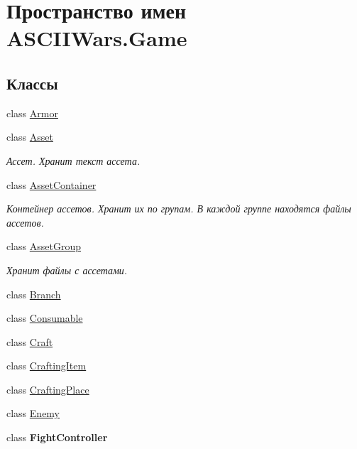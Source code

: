 \hypertarget{namespace_a_s_c_i_i_wars_1_1_game}{}\section{Пространство имен A\+S\+C\+I\+I\+Wars.\+Game}
\label{namespace_a_s_c_i_i_wars_1_1_game}
\subsection*{Классы}
\begin{DoxyCompactItemize}
\item 
class \hyperlink{class_a_s_c_i_i_wars_1_1_game_1_1_armor}{Armor}
\item 
class \hyperlink{class_a_s_c_i_i_wars_1_1_game_1_1_asset}{Asset}
\begin{DoxyCompactList}\small\item\em Ассет. Хранит текст ассета. \end{DoxyCompactList}\item 
class \hyperlink{class_a_s_c_i_i_wars_1_1_game_1_1_asset_container}{Asset\+Container}
\begin{DoxyCompactList}\small\item\em Контейнер ассетов. Хранит их по групам. В каждой группе находятся файлы ассетов. \end{DoxyCompactList}\item 
class \hyperlink{class_a_s_c_i_i_wars_1_1_game_1_1_asset_group}{Asset\+Group}
\begin{DoxyCompactList}\small\item\em Хранит файлы с ассетами. \end{DoxyCompactList}\item 
class \hyperlink{class_a_s_c_i_i_wars_1_1_game_1_1_branch}{Branch}
\item 
class \hyperlink{class_a_s_c_i_i_wars_1_1_game_1_1_consumable}{Consumable}
\item 
class \hyperlink{class_a_s_c_i_i_wars_1_1_game_1_1_craft}{Craft}
\item 
class \hyperlink{class_a_s_c_i_i_wars_1_1_game_1_1_crafting_item}{Crafting\+Item}
\item 
class \hyperlink{class_a_s_c_i_i_wars_1_1_game_1_1_crafting_place}{Crafting\+Place}
\item 
class \hyperlink{class_a_s_c_i_i_wars_1_1_game_1_1_enemy}{Enemy}
\item 
class {\bfseries Fight\+Controller}
\item 

\end{DoxyCompactItemize}
